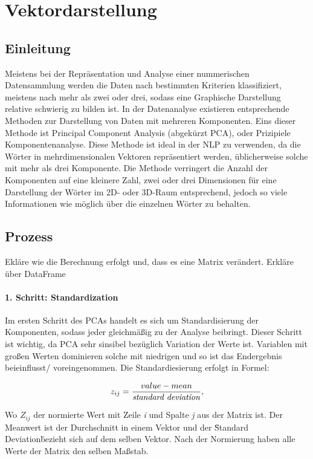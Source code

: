 \chapter{Vektordarstellung}

\section{Einleitung}

Meistens bei der Repräsentation und Analyse einer nummerischen Datensammlung werden die Daten nach bestimmten Kriterien klassifiziert, meistens nach mehr als zwei oder drei, sodass eine Graphische Darstellung relative schwierig zu bilden ist. In der Datenanalyse existieren entsprechende Methoden zur Darstellung von Daten mit mehreren Komponenten. Eins dieser Methode ist Principal Component Analysis (abgekürzt PCA), oder Prizipiele Komponentenanalyse. Diese Methode ist ideal in der NLP zu verwenden, da die Wörter in mehrdimensionalen Vektoren repräsentiert werden, üblicherweise solche mit mehr als drei Komponente. Die Methode verringert die Anzahl der Komponenten auf eine kleinere Zahl, zwei oder drei Dimensionen für eine Darstellung der Wörter im 2D- oder 3D-Raum entsprechend, jedoch so viele Informationen wie möglich über die einzelnen Wörter zu behalten.

\section{Prozess}

Ekläre wie die Berechnung erfolgt und, dass es eine Matrix verändert. Erkläre über DataFrame

\subsubsection{1. Schritt: Standardization}

Im ersten Schritt des PCAs handelt es sich um Standardisierung der Komponenten, sodass jeder gleichmäßig zu der Analyse beibringt. Dieser Schritt ist wichtig, da PCA sehr sinsibel bezüglich Variation der Werte ist. Variablen mit großen Werten dominieren solche mit niedrigen und so ist das Endergebnis beieinflusst/ voreingenommen. Die Standardiesierung erfolgt in Formel:

\begin{equation}
	z_{ij} = \frac{value - mean}{\text{\emph{standard deviation}}},
\end{equation}

Wo \emph{$Z_{ij}$} der normierte Wert mit Zeile \emph{i} und Spalte \emph{j} aus der Matrix ist. Der Meanwert ist der Durchschnitt in einem Vektor und der \" Standard Deviation\" bezieht sich auf dem selben Vektor. Nach der Normierung haben alle Werte der Matrix den selben Maßstab.

